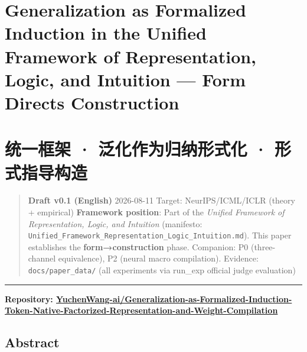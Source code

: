 \documentclass[
]{article}
\author{}
\date{}
\begin{document}
\section{Generalization as Formalized Induction in the Unified Framework
of Representation, Logic, and Intuition --- Form Directs
Construction}\label{generalization-as-formalized-induction-in-the-unified-framework-of-representation-logic-and-intuition-form-directs-construction}

\section{统一框架 · 泛化作为归纳形式化 ·
形式指导构造}\label{ux7edfux4e00ux6846ux67b6-ux6cdbux5316ux4f5cux4e3aux5f52ux7eb3ux5f62ux5f0fux5316-ux5f62ux5f0fux6307ux5bfcux6784ux9020}

\begin{quote}
\textbf{Draft v0.1 (English)} \textbar{} 2026-08-11 Target:
NeurIPS/ICML/ICLR (theory + empirical) \textbf{Framework position}: Part
of the \emph{Unified Framework of Representation, Logic, and Intuition}
(manifesto:
\texttt{Unified\_Framework\_Representation\_Logic\_Intuition.md}). This
paper establishes the \textbf{form→construction} phase. Companion: P0
(three-channel equivalence), P2 (neural macro compilation). Evidence:
\texttt{docs/paper\_data/} (all experiments via run\_exp official judge
evaluation)
\end{quote}

\begin{center}\rule{0.5\linewidth}{0.5pt}\end{center}

\textbf{Repository:
\href{https://github.com/YuchenWang-ai/Generalization-as-Formalized-Induction-Token-Native-Factorized-Representation-and-Weight-Compilation}{YuchenWang-ai/Generalization-as-Formalized-Induction-Token-Native-Factorized-Representation-and-Weight-Compilation}}

\subsection{Abstract}\label{abstract}
\end{document}
